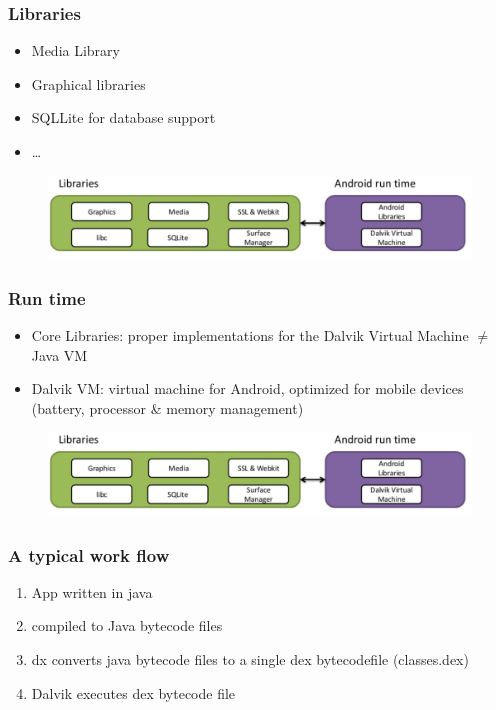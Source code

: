 \documentclass{beamer}
\begin{document}
\begin{frame}
\frametitle{Libraries}
\begin{itemize}
\item Media Library
\item Graphical libraries 
\item SQLLite for database support
\item \dots
\end{itemize}

\begin{figure}[b]
	\centering
		\includegraphics[width=\textwidth]{img/runtimeLibraries.pdf}
	\label{fig:kernel}
\end{figure}

\end{frame}

\begin{frame}
\frametitle{Run time}
\begin{itemize}
\item Core Libraries: proper implementations for the Dalvik Virtual Machine $\neq$ Java VM
\item Dalvik VM: virtual machine for Android, optimized for mobile devices (battery, processor \& memory management) 
\end{itemize}

\begin{figure}[b]
	\centering
		\includegraphics[width=\textwidth]{img/runtimeLibraries.pdf}
	\label{fig:kernel}
\end{figure}

\end{frame}

\begin{frame}
\frametitle{A typical work flow}

\begin{enumerate}
	\item App written in java
	\item compiled to Java bytecode files
	\item dx converts java bytecode files to a single dex bytecodefile (classes.dex)
	\item Dalvik executes dex bytecode file 
\end{enumerate}
\end{frame}
\end{document}
